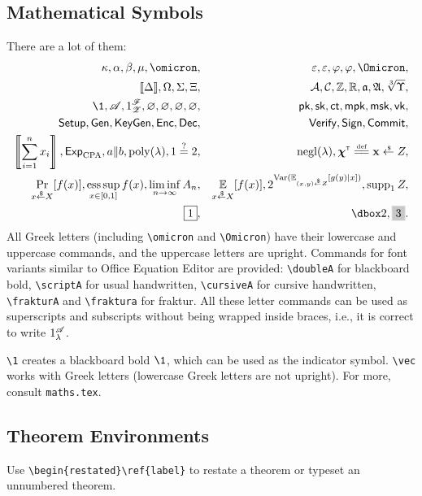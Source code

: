 \subsection{Mathematical Symbols}

There are a lot of them:
\begin{align*}
\kappa,\alpha,\beta,\mu,\omicron,&&
\epsilon,\varepsilon,\phi,\varphi,\Omicron,&\\
\llbracket\Delta\rrbracket,\Omega,\Sigma,\Xi,&&
\scriptA,\scriptC,\doubleZ,\doubleR,\fraktura,\frakturA,\cbrt\Upsilon,&\\
\1,\cursiveA,1^\cursiveF_\cursiveZ,\emptyset,\varnothing,\nothing,\varemptyset,&&
\pk,\sk,\ct,\mpk,\msk,\vk,\\
\Setup,\Gen,\KeyGen,\Enc,\Dec,&&
\Verify,\Sign,\Commit,\\
\left\llbracket\sum_{i=1}^{n}{x_i}\right\rrbracket,
\ExpCPA,a\concat b,\poly(\lambda),1\iseq 2,&&
\negl(\lambda),\vec{\chi}^\transpose\defeq\vec{x}\draws Z,\\
\Pr_{x\draws X}[f(x)],
\esssup_{x\in[0,1]}{f(x)},
\liminf_{n\to\infty}{A_n},&&
\EX_{x\draws X}[f(x)],2^{\Var({\EX_{(x,y)\draws Z}[g(y)|x]})},\supp_1 Z,\\
\boxed{1},&&
\dashboxed{2},\grayboxed{3}.
\end{align*}
All Greek letters
(including \texttt{\textbackslash omicron} and \texttt{\textbackslash Omicron})
have their lowercase and uppercase commands,
and the uppercase letters are upright.
Commands for font variants similar to Office Equation Editor are provided:
\texttt{\textbackslash doubleA}
for blackboard bold,
\texttt{\textbackslash scriptA}
for usual handwritten,
\texttt{\textbackslash cursiveA}
for cursive handwritten,
\texttt{\textbackslash frakturA} and \texttt{\textbackslash fraktura}
for fraktur.
All these letter commands
can be used as superscripts and subscripts
without being wrapped inside braces, i.e.,
it is correct to write $1^{\mathscr{A}}_\lambda$.

\texttt{\textbackslash 1} creates a blackboard bold $\1$,
which can be used as the indicator symbol.
\texttt{\textbackslash vec} works with Greek letters (lowercase Greek letters are not upright).
For more, consult \texttt{maths.tex}.

\subsection{Theorem Environments}

Use \texttt{\textbackslash begin\{restated\}{\textbackslash ref\{label\}}} to restate a theorem or typeset an unnumbered theorem.

